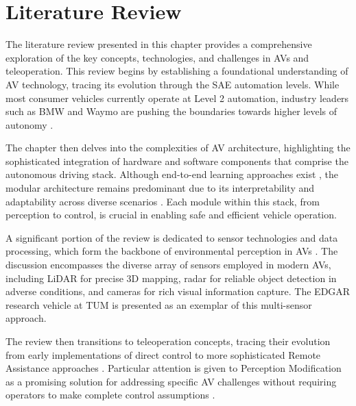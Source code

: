 
\chapter{Literature Review}\label{chapter:literaturereview}
The literature review presented in this chapter provides a comprehensive exploration of the key concepts,
technologies, and challenges in \acp{AV} and teleoperation. This review begins by establishing a
foundational understanding of \ac{AV} technology, tracing its evolution through the SAE automation levels.
While most consumer vehicles currently operate at Level 2 automation, industry leaders such as BMW and Waymo
are pushing the boundaries towards higher levels of autonomy \cite{bmw2024} \cite{evmagazine2024}.

The chapter then delves into the complexities of \ac{AV} architecture, highlighting the sophisticated
integration of hardware and software components that comprise the autonomous driving stack. Although end-to-end learning
approaches exist \cite{e2e}, the modular architecture remains predominant due to its interpretability and adaptability
across diverse scenarios \cite{codevilla2019limitations}. Each module within this stack, from perception to control,
is crucial in enabling safe and efficient vehicle operation.

A significant portion of the review is dedicated to sensor technologies and data processing, which form the backbone of
environmental perception in \acp{AV} \cite{feng2020deep,el-sheimy2020sensorfusion}. The discussion encompasses
the diverse array of sensors employed in modern \acp{AV}, including LiDAR for precise 3D mapping, radar for reliable object
detection in adverse conditions, and cameras for rich visual information capture. The EDGAR research vehicle at TUM is presented
as an exemplar of this multi-sensor approach.

The review then transitions to teleoperation concepts, tracing their evolution from early implementations of direct control to more sophisticated
Remote Assistance approaches \cite{kay2024sharedcontrol,corridor,hosseini2024collaborative,feiler2023perception}. Particular attention is
given to Perception Modification as a promising solution for addressing specific \ac{AV} challenges without requiring operators
to make complete control assumptions \cite{Feiler2021ThePM,Brecht}.

